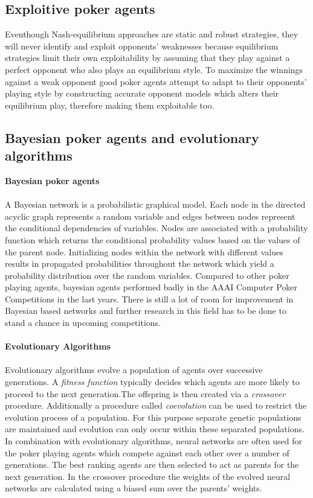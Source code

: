 \subsection{Exploitive poker agents}
Eventhough Nash-equilibrium approaches are static and robust strategies, they will never identify and exploit opponents' weaknesses because equilibrium strategies limit their own exploitability by assuming that they play against a perfect opponent who also plays an equilibrium style.\cite{review} To maximize the winnings against a weak opponent good poker agents attempt to adapt to their opponents' playing style by constructing accurate opponent models which alters their equilibrium play, therefore making them exploitable too.
\subsection{Bayesian poker agents and evolutionary algorithms}
\textbf{Bayesian poker agents}\\\\
A Bayesian network is a probabilistic graphical model. Each node in the directed acyclic graph represents a random variable and edges between nodes represent the conditional dependencies of variables. Nodes are associated with a probability function which returns the conditional probability values based on the values of the parent node. Initializing nodes within the network with different values results in propagated probabilities throughout the network which yield a probability distribution over the random variables. Compared to other poker playing agents, bayesian agents performed badly in the AAAI Computer Poker Competitions in the last years. There is still a lot of room for improvement in Bayesian based networks and further research in this field has to be done to stand a chance in upcoming competitions. \cite{review}\\\\
\textbf{Evolutionary Algorithms}\\\\
Evolutionary algorithms evolve a population of agents over successive generations. A \textit{fitness function} typically decides which agents are more likely to proceed to the next generation.The  offspring is then created via a \textit{crossover} procedure. Additionally a procedure called \textit{coevolution} can be used  to restrict the evolution process of a population. For this purpose separate genetic populations are maintained and evolution can only occur within these separated populations. In combination with evolutionary algorithms, neural networks are often used for the poker playing agents which compete against each other over a number of generations. The best ranking agents are then selected to act as parents for the next generation. In the crossover procedure the weights of the evolved neural networks are calculated using a biased sum over the parents' weights.\cite{review}

